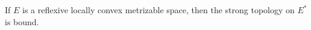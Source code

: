 If $E$ is a reflexive locally convex metrizable space, then the strong topology on $E^{*}$ is bound.
